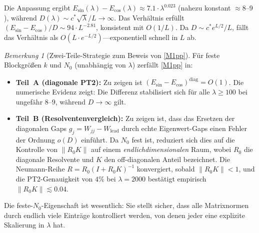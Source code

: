 ﻿\documentclass[12pt,a4paper]{article}
\theoremstyle{definition}
\theoremstyle{remark}
\newtheorem{remark}[theorem]{Bemerkung}
\begin{document}
\noindent Die Anpassung ergibt $E_{\sin}(\lambda) - E_{\cos}(\lambda) \approx 7.1\cdot\lambda^{0.023}$ (nahezu konstant $\approx 8$--$9$), während $D(\lambda) \sim c^*\sqrt{\lambda}/L \to \infty$. Das Verhältnis erfüllt $(E_{\sin} - E_{\cos})/D \sim 94\cdot L^{-2.81}$, konsistent mit $O(1/L)$. Da $D \sim c^* e^{L/2}/L$, fällt das Verhältnis als $O(L\cdot e^{-L/2})$---exponentiell schnell in $L$ ab.

\begin{remark}[Zwei-Teile-Strategie zum Beweis von \ref{M1pp}]
\label{rem:two-parts}
Für feste Blockgrößen $k$ und $N_0$ (unabhängig von $\lambda$) zerfällt \ref{M1pp} in:
\begin{itemize}
  \item \textbf{Teil~A (diagonale PT2):} Zu zeigen ist $(E_{\sin} - E_{\cos})^{\mathrm{diag}} = O(1)$. Die numerische Evidenz zeigt: Die Differenz stabilisiert sich für alle $\lambda \geq 100$ bei ungefähr $8$--$9$, während $D \to \infty$ gilt.
  \item \textbf{Teil~B (Resolventenvergleich):} Zu zeigen ist, dass das Ersetzen der diagonalen Gaps $g_j = W_{jj} - W_{\mathrm{lead}}$ durch echte Eigenwert-Gaps einen Fehler der Ordnung $o(D)$ einführt. Da $N_0$ fest ist, reduziert sich dies auf die Kontrolle von $\|R_0 K\|$ auf einem \emph{endlichdimensionalen} Raum, wobei $R_0$ die diagonale Resolvente und $K$ den off-diagonalen Anteil bezeichnet. Die Neumann-Reihe $R = R_0(I + R_0 K)^{-1}$ konvergiert, sobald $\|R_0 K\| < 1$, und die PT2-Genauigkeit von $4\%$ bei $\lambda = 2000$ bestätigt empirisch $\|R_0 K\| \lesssim 0.04$.
\end{itemize}
Die feste-$N_0$-Eigenschaft ist wesentlich: Sie stellt sicher, dass alle Matrixnormen durch endlich viele Einträge kontrolliert werden, von denen jeder eine explizite Skalierung in $\lambda$ hat.
\end{remark}
\end{document}
